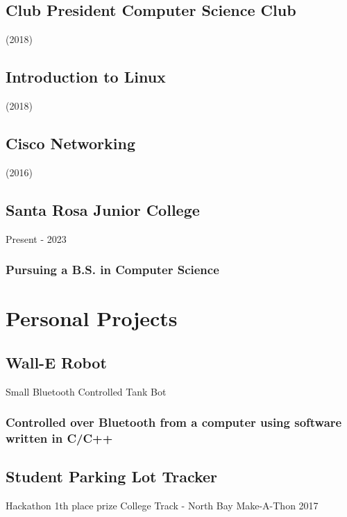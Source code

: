 \documentclass{article}
\begin{document}
        \subsection{Club President  Computer Science Club}  (2018)
        \vspace{-2mm}   
		 
		\subsection{Introduction to Linux}  (2018)
        \vspace{-2mm}   

		\subsection{Cisco Networking}  (2016)
        \vspace{-2mm}   
         
        \subsection{Santa Rosa Junior College} Present - 2023 
        \vspace{-2mm}
            \subsubsection{Pursuing a B.S. in Computer Science}
\section{Personal Projects}

	\subsection{Wall-E Robot}Small Bluetooth Controlled Tank Bot
    	\vspace{-3mm}
		\subsubsection{Controlled over Bluetooth from a computer using software written in C/C++}
		
	\subsection{Student Parking Lot Tracker} Hackathon 1th place prize College Track - North Bay Make-A-Thon 2017
    	\vspace{-3mm}
\end{document}
